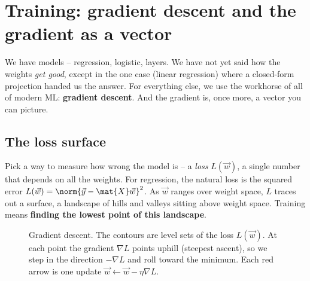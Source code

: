 \section{Training: gradient descent and the gradient as a vector}
\label{ch34:gd}

We have models -- regression, logistic, layers. We have not yet said how the weights
\emph{get good}, except in the one case (linear regression) where a closed-form
projection handed us the answer. For everything else, we use the workhorse of all of
modern ML: \textbf{gradient descent}. And the gradient is, once more, a vector you can
picture.

\subsection{The loss surface}

Pick a way to measure how wrong the model is -- a \emph{loss} $L(\vec{w})$, a single
number that depends on all the weights. For regression, the natural loss is the squared
error $L(\vec{w})=\norm{\vec{y}-\mat{X}\vec{w}}^2$. As $\vec{w}$ ranges over weight space,
$L$ traces out a surface, a landscape of hills and valleys sitting above weight space.
Training means \textbf{finding the lowest point of this landscape}.

\begin{figure}[H]
\centering
{}
\caption{Gradient descent. The contours are level sets of the loss $L(\vec{w})$. At each
point the gradient $\nabla L$ points uphill (steepest ascent), so we step in the
direction $-\nabla L$ and roll toward the minimum. Each red arrow is one update
$\vec{w}\leftarrow\vec{w}-\eta\nabla L$.}
\label{ch34:fig-gd}
\end{figure}

